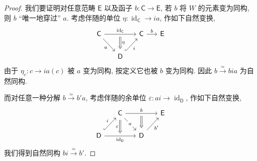 \begin{proof}
	我们要证明对任意范畴 $\mathsf E$ 以及函子 $b\colon \mathsf C\to\mathsf E$, 若 $b$ 将 $W$ 的元素变为同构, 则 $b$ ``唯一地穿过'' $a$. 考虑伴随的单位 $\eta\colon \operatorname{id}_{\mathsf C}\to ia$, 作如下自然变换,
	\[\begin{tikzcd}[ampersand replacement=\&,column sep=1.5em]
		{\mathsf C} \&\& {\mathsf C} \& {\mathsf E} \\
		\& {\mathsf D}
		\arrow["a"', from=1-1, to=2-2]
		\arrow["i"', hook, from=2-2, to=1-3]
		\arrow[""{name=0, anchor=center, inner sep=0}, "{\operatorname{id}_{\mathsf C}}", from=1-1, to=1-3]
		\arrow["b", from=1-3, to=1-4]
		\arrow["\eta", shorten <=3pt,shorten >=3pt, Rightarrow, from=0, to=2-2]
	\end{tikzcd}\]
	由于 $\eta_c\colon c\to ia(c)$ 被 $a$ 变为同构, 按定义它也被 $b$ 变为同构.
	因此 $b\overset{\simeq}{\to}bia$ 为自然同构.
	
	而对任意一种分解 $b\overset{\simeq}{\to}b'a$, 考虑伴随的余单位 $\varepsilon\colon ai\to\operatorname{id}_{\mathsf D}$, 作如下自然变换,
	\[\begin{tikzcd}[ampersand replacement=\&,column sep=1.5em]
		\& {\mathsf C} \&\& {\mathsf E} \\
		{\mathsf D} \&\& {\mathsf D}
		\arrow["i", hook, from=2-1, to=1-2]
		\arrow[""{name=0, anchor=center, inner sep=0}, "b", from=1-2, to=1-4]
		\arrow["a"{description}, from=1-2, to=2-3]
		\arrow["{b'}"', from=2-3, to=1-4]
		\arrow[""{name=1, anchor=center, inner sep=0}, "{\operatorname{id}_{\mathsf D}}"', from=2-1, to=2-3]
		\arrow["\varepsilon"', shorten <=3pt, shorten >=3pt, Rightarrow, from=1-2, to=1]
		\arrow[shorten <=3pt, shorten >=3pt, Rightarrow, from=0, to=2-3]
	\end{tikzcd}\]
	我们得到自然同构 $bi\overset{\simeq}{\to}b'$.
\end{proof}

